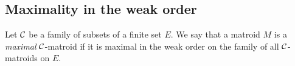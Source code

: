 \documentclass{daj}
\begin{document}
\subsection{Maximality in the weak order}
Let ${\cal C}$ be a family of subsets of a finite set $E$.
We say that a matroid $M$ is a {\em maximal} ${\cal C}$-matroid if it is maximal in the weak order on the family of all ${\cal C}$-matroids on $E$.


\end{document}
